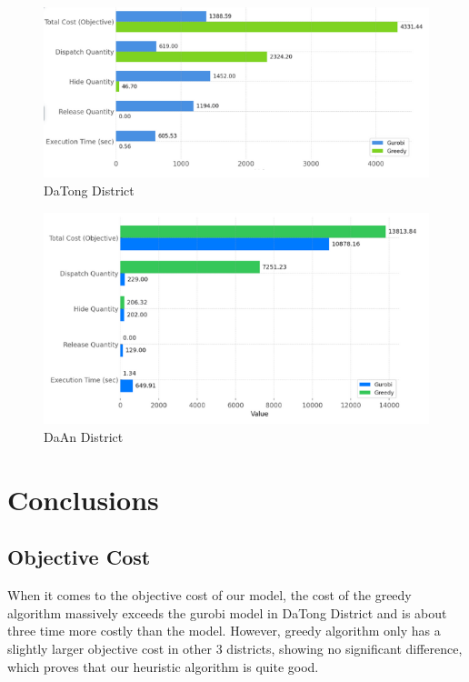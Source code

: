 \documentclass[11pt,a4paper]{article}
\begin{document}
\begin{figure}[H]
\centering
\includegraphics[width=textwidth]{Datong.png}
\caption{DaTong District}
\label{Figure 3}
\end{figure}

\begin{figure}[H]
\centering
\includegraphics[width=textwidth]{Daan.png}
\caption{DaAn District}
\label{Figure 4}
\end{figure}

\section{Conclusions}

\subsection*{Objective Cost}

When it comes to the objective cost of our model, the cost of the greedy algorithm massively exceeds the gurobi model in DaTong District and is about three time more costly than the model.
However, greedy algorithm only has a slightly larger objective cost in other 3 districts, showing no significant difference, which proves that our heuristic algorithm is quite good.
\end{document}
